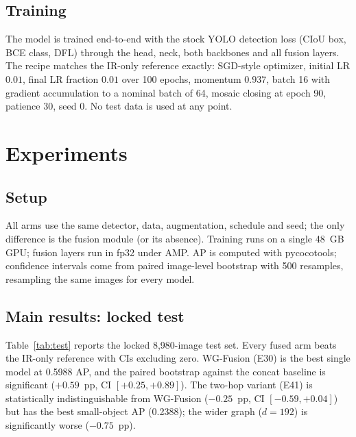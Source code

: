 \documentclass[10pt,twocolumn,letterpaper]{article}
\begin{document}
\subsection{Training}
The model is trained end-to-end with the stock YOLO detection loss (CIoU box,
BCE class, DFL) through the head, neck, both backbones and all fusion layers.
The recipe matches the IR-only reference exactly: SGD-style optimizer, initial
LR $0.01$, final LR fraction $0.01$ over 100 epochs, momentum $0.937$, batch
16 with gradient accumulation to a nominal batch of 64, mosaic closing at
epoch 90, patience 30, seed 0. No test data is used at any point.

\section{Experiments}

\subsection{Setup}
All arms use the same detector, data, augmentation, schedule and seed; the only
difference is the fusion module (or its absence). Training runs on a single
48~GB GPU; fusion layers run in fp32 under AMP. AP is computed with
pycocotools; confidence intervals come from paired image-level bootstrap with
500 resamples, resampling the same images for every model.

\subsection{Main results: locked test}
Table~\ref{tab:test} reports the locked 8,980-image test set. Every fused arm
beats the IR-only reference with CIs excluding zero. WG-Fusion (E30) is the
best single model at 0.5988 AP, and the paired bootstrap against the concat
baseline is significant ($+0.59$~pp, CI $[+0.25,+0.89]$). The two-hop variant
(E41) is statistically indistinguishable from WG-Fusion ($-0.25$~pp,
CI $[-0.59,+0.04]$) but has the best small-object AP (0.2388); the wider
graph ($d{=}192$) is significantly worse ($-0.75$~pp).
\end{document}
